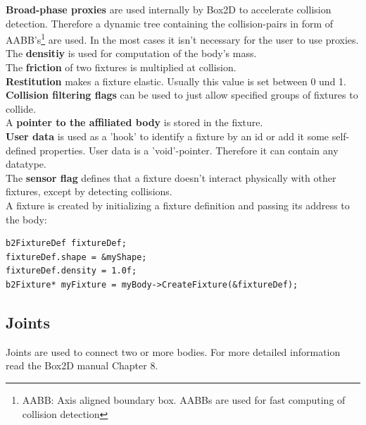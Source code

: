\documentclass[10pt,a4paper,DIV=11]{scrreprt}
\begin{document}
\textbf{Broad-phase proxies} are used internally by Box2D to accelerate collision detection. Therefore a dynamic tree containing the collision-pairs in form of AABB's\footnote{AABB: Axis aligned boundary box. AABBs are used for fast computing of collision detection} are used. In the most cases it isn't necessary for the user to use proxies. \\

The \textbf{densitiy} is used for computation of the body's mass.\\

The \textbf{friction} of two fixtures is multiplied at collision. \\

\textbf{Restitution} makes a fixture elastic. Usually this value is set between 0 und 1. \\

\textbf{Collision filtering flags} can be used to just allow specified groups of fixtures to collide. \\

A \textbf{pointer to the affiliated body} is stored in the fixture.\\

\textbf{User data} is used as a 'hook' to identify a fixture by an id or add it some self-defined properties. User data is a 'void'-pointer. Therefore it can contain any datatype. \\

The \textbf{sensor flag} defines that a fixture doesn't interact physically with other fixtures, except by detecting collisions. \\



A fixture is created by initializing a fixture definition and passing its address to the body:

\begin{lstlisting}[caption={Creation of a fixture (source Box2D manual)},label=lst:fixture-create]
b2FixtureDef fixtureDef;
fixtureDef.shape = &myShape;
fixtureDef.density = 1.0f;
b2Fixture* myFixture = myBody->CreateFixture(&fixtureDef);
\end{lstlisting}


\subsection{Joints}
Joints are used to connect two or more bodies. For more detailed information read the Box2D manual Chapter 8.
\end{document}
